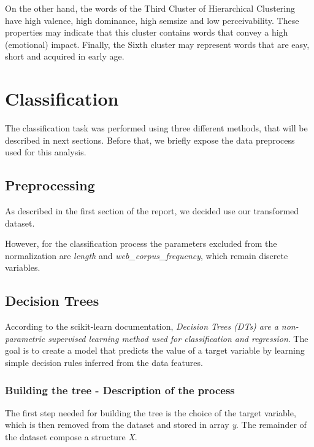 \documentclass[a4paper,11pt,dvipsnames]{article}
\begin{document}
On the other hand, the words of the Third Cluster of Hierarchical Clustering have high valence, high dominance, high semsize and low perceivability. These properties may indicate that this cluster contains words that convey a high (emotional) impact. Finally, the Sixth cluster may represent words that are easy, short and acquired in early age.


\section{Classification}

The classification task was performed using three different methods, that will be described in next sections. Before that, we briefly expose the data preprocess used for this analysis.  

\subsection{Preprocessing}

As described in the first section of the report, we decided use our transformed dataset. 

However, for the classification process the parameters excluded from the normalization are \textit{length} and \textit{web\_corpus\_frequency}, which remain discrete variables.

\subsection{Decision Trees}\label{sec:decisio-tree}

According to the scikit-learn documentation, \textit{Decision Trees (DTs) are a non-parametric supervised learning method used for classification and regression}\cite{JMLR:v12:pedregosa11a}. The goal is to create a model that predicts the value of a target variable by learning simple decision rules inferred from the data features.


\subsubsection{Building the tree - Description of the process}\label{sec:building_tree}

The first step needed for building the tree is the choice of the target variable, which is then removed from the dataset and stored in array \textit{y}. The remainder of the dataset compose a structure \textit{X}.
\end{document}
